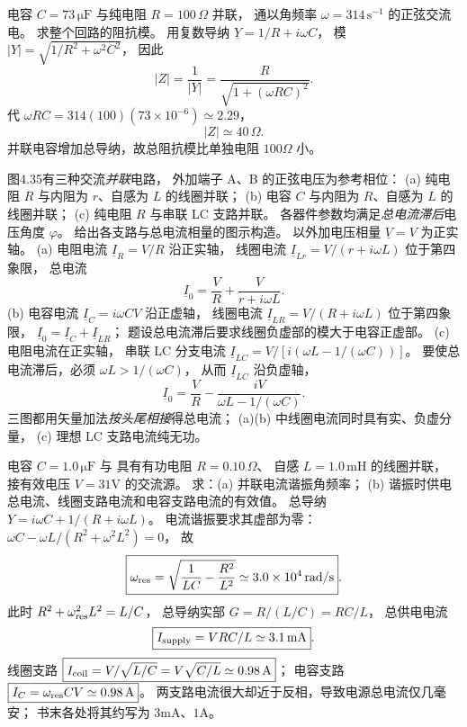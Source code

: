 电容 $C=73\,\mathrm{\mu F}$ 与纯电阻
$R=100\,\Omega$ 并联，
通以角频率 $\omega=314\,\mathrm{s^{-1}}$ 的正弦交流电。
求整个回路的阻抗模。
\exsolution
用复数导纳
$\underline Y=1/R+i\omega C$，
模
$|Y|=\sqrt{1/R^2+\omega^2C^2}$，
因此
\[
\boxed{|Z|=\frac1{|Y|}
=\frac R{\sqrt{1+(\omega RC)^2}}}.
\]
代 $\omega RC=314(100)(73\times10^{-6})\simeq2.29$，
\[
\boxed{|Z|\simeq40\,\Omega}.
\]
\excheck 并联电容增加总导纳，故总阻抗模比单独电阻 $100\Omega$ 小。

图4.35有三种交流\emph{并联}电路，
外加端子 A、B 的正弦电压为参考相位：
(a) 纯电阻 $R$ 与内阻为 $r$、自感为 $L$ 的线圈并联；
(b) 电容 $C$ 与内阻为 $R$、自感为 $L$ 的线圈并联；
(c) 纯电阻 $R$ 与串联 LC 支路并联。
各器件参数均满足\emph{总电流滞后}电压角度 $\varphi$。
给出各支路与总电流相量的图示构造。
\exsolution
以外加电压相量 $\underline V=V$ 为正实轴。
(a) 电阻电流
$\underline I_R=V/R$ 沿正实轴，
线圈电流
$\underline I_{Lr}=V/(r+i\omega L)$ 位于第四象限，
总电流
\[
\boxed{\underline I_0=\frac VR+\frac V{r+i\omega L}}.
\]
(b) 电容电流
$\underline I_C=i\omega CV$ 沿正虚轴，
线圈电流
$\underline I_{LR}=V/(R+i\omega L)$ 位于第四象限，
$\boxed{\underline I_0=\underline I_C+\underline I_{LR}}$；
题设总电流滞后要求线圈负虚部的模大于电容正虚部。
(c) 电阻电流在正实轴，
串联 LC 分支电流
$\underline I_{LC}=V/[i(\omega L-1/(\omega C))]$。
要使总电流滞后，必须
$\omega L>1/(\omega C)$，
从而 $\underline I_{LC}$ 沿负虚轴，
\[
\boxed{\underline I_0=
\frac VR-\frac{iV}{\omega L-1/(\omega C)}}.
\]
\excheck 三图都用矢量加法\emph{按头尾相接}得总电流；
(a)(b) 中线圈电流同时具有实、负虚分量，
(c) 理想 LC 支路电流纯无功。

电容 $C=1.0\,\mathrm{\mu F}$ 与
具有有功电阻 $R=0.10\,\Omega$、
自感 $L=1.0\,\mathrm{mH}$ 的线圈并联，
接有效电压 $V=31$V 的交流源。
求：(a) 并联电流谐振角频率；
(b) 谐振时供电总电流、线圈支路电流和电容支路电流的有效值。
\exsolution
总导纳
$Y=i\omega C+1/(R+i\omega L)$。
电流谐振要求其虚部为零：
$\omega C-\omega L/(R^2+\omega^2L^2)=0$，
故
\[
\boxed{\omega_{\rm res}
=\sqrt{\frac1{LC}-\frac{R^2}{L^2}}
\simeq3.0\times10^4\,\mathrm{rad/s}}.
\]
此时
$R^2+\omega_{\rm res}^2L^2=L/C$，
总导纳实部
$G=R/(L/C)=RC/L$，
总供电电流
\[
\boxed{I_{\rm supply}=VRC/L
\simeq3.1\,\mathrm{mA}}.
\]
线圈支路
$\boxed{I_{\rm coil}
=V/\sqrt{L/C}=V\sqrt{C/L}\simeq0.98\,\mathrm A}$；
电容支路
$\boxed{I_C=\omega_{\rm res}CV\simeq0.98\,\mathrm A}$。
\excheck 两支路电流很大却近于反相，导致电源总电流仅几毫安；
书末各处将其约写为 $3$mA、$1$A。

